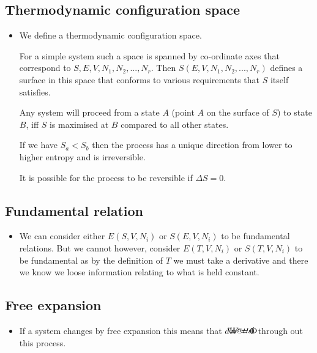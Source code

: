 \documentclass[11pt]{article}
\makeatletter
\DeclareRobustCommand{\dbar}{\text{\addbar@{0.2ex}{0.25em}{1}}d}
\newcommand{\addbar@}[3]{%
  \makebox[0pt][l]{%
    \raisebox{#1}[0pt][0pt]{%
      \kern#2
      \scalebox{#3}[0.8]{$\m@th\mathchar"84$}%
    }%
  }%
}
\numberwithin{equation}{section}
\numberwithin{equation}{section}
\makeatother
\begin{document}
\subsection{Thermodynamic configuration space}
\begin{itemize}
    \item We define a thermodynamic configuration space.

For a simple system such a space is spanned by co-ordinate axes that correspond to $S,E,V,N_1,N_2,...,N_r$.  Then $S(E,V,N_1,N_2,...,N_r)$ defines a surface in this space that conforms to various requirements that $S$ itself satisfies.  

Any system will proceed from a state $A$ (point $A$ on the surface of $S$) to state $B$, iff $S$ is maximised at $B$ compared to all other states. 

If we have $S_a <  S_b$ then the process has a unique direction from lower to higher entropy and is irreversible. 

It is possible for the process to be reversible if $\Delta S =0$. 

\end{itemize}

\subsection{Fundamental relation}
\begin{itemize}
    \item We can consider either $E(S,V,N_i)$ or $S(E,V,N_i)$ to be fundamental relations. But we cannot however, consider $E(T,V,N_i)$ or $S(T,V,N_i)$ to be fundamental as by the definition of $T$ we must take a derivative and there we know we loose information relating to what is held constant. 
\end{itemize}


\subsection{Free expansion}
\begin{itemize}
    \item If a system changes by free expansion this means that $\dbar W =0$ through out this process.
\end{itemize}
\end{document}
